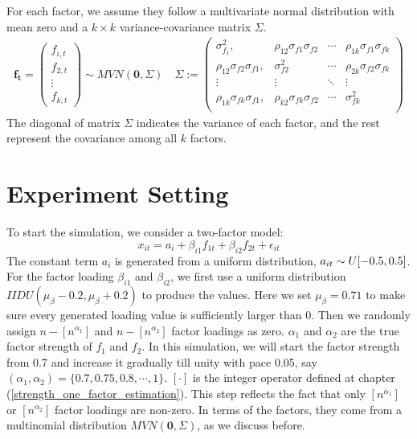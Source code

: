  For each factor, we assume they follow a multivariate normal distribution with mean zero and a $k\times k$ variance-covariance matrix $\Sigma$. 
\begin{align*}
\bm{f_t} = \begin{pmatrix}
f_{i,t}\\f_{2,t}\\\vdots\\f_{k,t}
\end{pmatrix} \sim MVN(\bm{0}, \Sigma) \quad
 \Sigma := 
\begin{pmatrix}
\sigma^2_{f_1}, & \rho_{12}\sigma_{f1}\sigma_{f2} &\cdots  & \rho_{1k}\sigma_{f1}\sigma_{fk}\\
\rho_{12}\sigma_{f2}\sigma_{f1}, & \sigma^2_{f2} &\cdots  & \rho_{2k}\sigma_{f2}\sigma_{fk}\\
\vdots & \vdots & \ddots & \vdots \\
\rho_{1k}\sigma_{fk}\sigma_{f1}, & \rho_{k2}\sigma_{fk}\sigma_{f2} &\cdots  & \sigma^2_{fk}\\
\end{pmatrix}
\end{align*}
The diagonal of matrix $\Sigma$ indicates the variance of each factor, and the rest represent the covariance among all $k$ factors.


	\section{Experiment Setting}\label{exp_set}
To start the simulation, we consider a two-factor model:
\[    x_{it} = a_{i} + \beta_{i1}f_{1t} + \beta_{i2}f_{2t}+\epsilon_{it} \tag{8} \label{two_factor}   \]
The constant term $a_{i}$ is generated from a uniform distribution, $a_{it} \sim \mathnormal{U}[-0.5,0.5]$.
For the factor loading $\beta_{i1}$ and $\beta_{i2}$, we first use a uniform distribution $IIDU(\mu_{\beta} - 0.2, \mu_{\beta}+0.2)$ to produce the values.
Here we set $\mu_{\beta}=0.71$ to make sure every generated loading value is sufficiently larger than 0.
Then we randomly assign $n - [n^{\alpha_{1}}]$ and $n - [n^{\alpha_{2}}]$ factor loadings as zero.
$\alpha_1$ and $\alpha_2$ are the true factor strength of $f_1$ and $f_2$. 
In this simulation, we will start the factor strength from 0.7 and increase it gradually till unity with pace 0.05, say $(\alpha_{1}, \alpha_{2}) = \{0.7, 0.75,0.8,\cdots,1\}$.
 $[\cdot]$ is the integer operator defined at chapter (\ref{strength_one_factor_estimation}).
This step reflects the fact that only $[n^{\alpha_1}]$ or $[n^{\alpha_2}]$ factor loadings are non-zero.
In terms of the factors, they come from a multinomial distribution $MVN(\bm{0}, \Sigma) $, as we discuss before.

